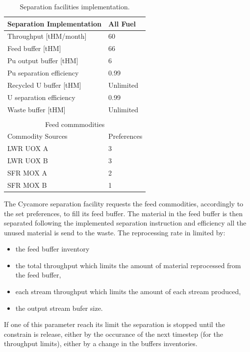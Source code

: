 \documentclass[12pt]{article}
\begin{document}
\begin{table}[h!]
    \centering
    \begin{tabular}{ll}
    \hline
    Separation Implementation  &  All Fuel   \\
    \hline
    Throughput [tHM/month]     &  60         \\
    Feed buffer [tHM]          &  66         \\
    Pu output buffer  [tHM]    &  6          \\
    Pu separation efficiency   &  0.99       \\
    Recycled U buffer [tHM]    &  Unlimited  \\
    U separation efficiency    &  0.99       \\
    Waste buffer [tHM]         &  Unlimited  \\ 
                                             \\
    \multicolumn{2}{c}{Feed commmodities}    \\
    \hline
    Commodity Sources         &  Preferences \\
    LWR UOX A                 &  3           \\
    LWR UOX B                 &  3           \\
    SFR MOX A                 &  2           \\
    SFR MOX B                 &  1           \\
    \hline
    \end{tabular}
    \caption{Separation facilities implementation.}
    \label{tab:fuelfab_2}
\end{table}

The Cycamore separation facility requests the feed commodities, accordingly to the
set preferences, to fill its feed buffer. The material in the feed buffer is then
separated following the implemented separation instruction and efficiency all the
unused material is send to the waste. The reprocessing rate in limited by:

\begin{itemize}

  \item the feed buffer inventory
  \item the total throughput which limits the amount of material reprocessed from
    the feed buffer,
  \item each stream throughput which limits the amount of each stream produced,
  \item the output stream bufer size.

\end{itemize}
If one of this parameter reach its limit the separation is stopped until the
constrain is release, either by the occurance of the next timestep (for the
throughput limits), either by a change in the buffers inventories. 
\end{document}
